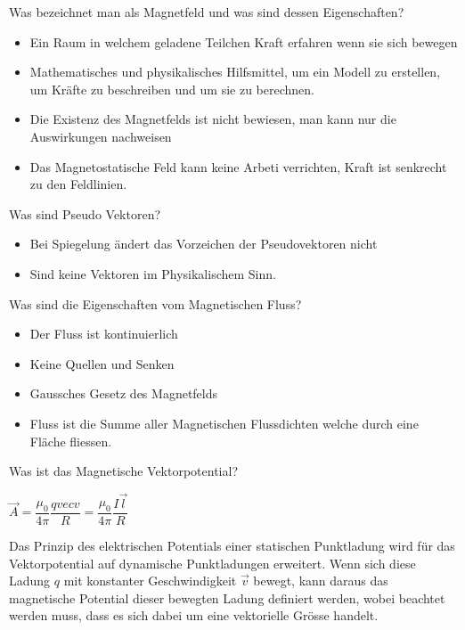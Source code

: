 \begin{karte}{Was bezeichnet man als Magnetfeld und was sind dessen Eigenschaften?}
	\begin{itemize}
		\item Ein Raum in welchem geladene Teilchen Kraft erfahren wenn sie sich bewegen
		\item Mathematisches und physikalisches Hilfsmittel, um ein Modell zu erstellen, um Kräfte zu beschreiben und um sie zu berechnen.
		\item Die Existenz des Magnetfelds ist nicht bewiesen, man kann nur die Auswirkungen nachweisen
		\item Das Magnetostatische Feld kann keine Arbeti verrichten, Kraft ist senkrecht zu den Feldlinien.
	\end{itemize}
\end{karte}

\begin{karte}{Was sind Pseudo Vektoren?}
	\begin{itemize}
		\item Bei Spiegelung ändert das Vorzeichen der Pseudovektoren nicht
		\item Sind keine Vektoren im Physikalischem Sinn.
	\end{itemize}
\end{karte}

\begin{karte}{Was sind die Eigenschaften vom Magnetischen Fluss?}
	\begin{itemize}
		\item Der Fluss ist kontinuierlich
		\item Keine Quellen und Senken
		\item Gaussches Gesetz des Magnetfelds
		\item Fluss ist die Summe aller Magnetischen Flussdichten welche durch eine Fläche fliessen.
	\end{itemize}
\end{karte}

\begin{karte}{Was ist das Magnetische Vektorpotential?}
	\begin{center}
		\begin{huge}
			$\vec{A}=\dfrac{\mu_{0}}{4 \pi} \dfrac{q vec{v}}{R}=\dfrac{\mu_{0}}{4 \pi} \dfrac{I \vec{l}}{R}$
		\end{huge}
	\end{center}
	Das Prinzip des elektrischen Potentials einer statischen Punktladung wird für das Vektorpotential auf dynamische Punktladungen erweitert. Wenn sich diese Ladung $q$ mit konstanter Geschwindigkeit $\vec{v}$ bewegt, kann daraus das magnetische Potential dieser bewegten Ladung definiert werden, wobei beachtet werden muss, dass es sich dabei um eine vektorielle Grösse handelt.
\end{karte}

